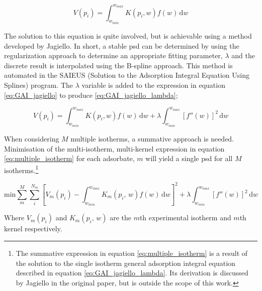 \begin{equation} \label{eq:GAI_jagiello}
    V(p_i) = \int_{w_{min}}^{w_{max}} K(p_i,w) f(w) \, \mathrm{d}w
\end{equation}

The solution to this equation is quite involved, but is achievable using a method developed by Jagiello.\citep{Jagiello1994Stable} In short, a stable \acrshort{psd} can be determined by using the regularization approach to determine an appropriate fitting parameter, $\lambda$\citep{Hansen2001, Hansen1993use, Hansen2001L} and the discrete result is interpolated using the B-spline approach.\citep{knott2000interpolating, prautzsch2002bezier, deboor1978practical} This method is automated in the SAIEUS (Solution to the Adsorption Integral Equation Using Splines) program.\citep{Jagiello1994Stable} The $\lambda$ variable is added to the expression in equation \ref{eq:GAI_jagiello} to produce \ref{eq:GAI_jagiello_lambda};

\begin{equation} \label{eq:GAI_jagiello_lambda}
    V(p_i) = \int_{w_{min}}^{w_{max}} K(p_i,w) f(w) \, \mathrm{d}w + \lambda\int_{w_{min}}^{w_{max}}\left[ f''(w) \right]^2\, \mathrm{d}w
\end{equation}

When considering $M$ multiple isotherms, a summative approach is needed.\citep{caguiat2014uncertainties} Minimisation of the multi-isotherm, multi-kernel  expression in equation \ref{eq:multiple_isotherm} for each \gls{adsorbate}, $m$ will yield a single \acrshort{psd} for all $M$ isotherms.\footnote{The summative expression in equation \ref{eq:multiple_isotherm} is a result of the solution to the single isotherm general \gls{adsorption} integral equation described in equation \ref{eq:GAI_jagiello_lambda}. Its derivation is discussed by Jagiello in the original paper,\citep{Jagiello1994Stable} but is outside the scope of this work.}

\begin{equation} \label{eq:multiple_isotherm}
    \mathrm{min}\sum_{m}^{M}\sum_{i}^{N_m}\left[ V_m(p_i) - \int_{w_{min}}^{w_{max}}K_m(p_i,\,w)f(w)\,\mathrm{d}w\right]^2 + \lambda\int_{w_{min}}^{w_{max}}\left[ f''(w) \right]^2\, \mathrm{d}w
\end{equation}

Where $V_m(p_i)$ and $K_m(p_i,\,w)$ are the $m$th experimental isotherm and $m$th kernel respectively.\citep{Jagiello2015Dual, Jagiello2008Characterization, Jagiello2007}

